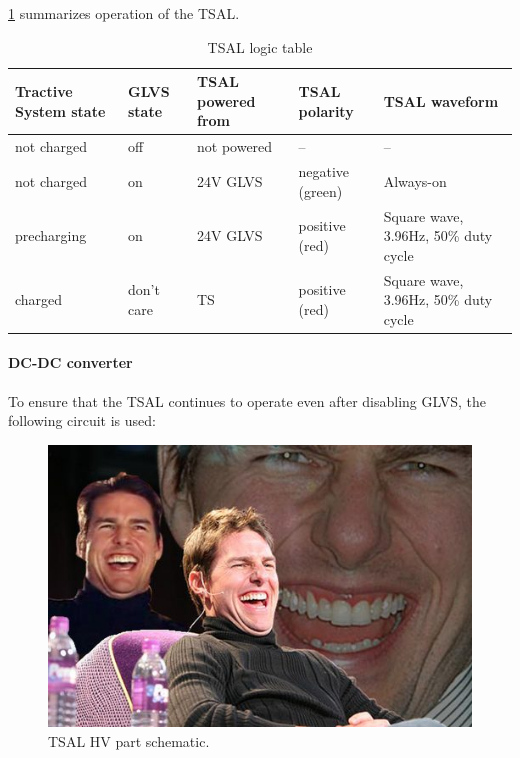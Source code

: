 \ref{fig:TSAL-logic-table} summarizes operation of the TSAL.

\begin{table}[H]
	\centering
	\caption{TSAL logic table}
	\begin{tabularx}{\textwidth}{|X|X|X|X|X|}
		\hline
		\textbf{Tractive System state} & \textbf{GLVS state} & \textbf{TSAL powered from} & \textbf{TSAL polarity} & \textbf{TSAL waveform} \\
		\hline
		not charged & off & not powered & -- & -- \\
		\hline
		not charged & on & 24V GLVS & negative (green) & Always-on \\
		\hline
		precharging & on & 24V GLVS & positive (red) & Square wave, 3.96Hz, 50\% duty cycle \\
		\hline
		charged & don't care & TS & positive (red) & Square wave, 3.96Hz, 50\% duty cycle \\
		\hline
	\end{tabularx}%
	\label{fig:TSAL-logic-table}
\end{table}%

\paragraph{DC-DC converter}

To ensure that the TSAL continues to operate even after disabling GLVS, the following circuit is used:


\begin{figure}[H]
	\centering
	\includegraphics[width=\textwidth]{./img/tsal-hv.jpg}
	\caption{TSAL HV part schematic.}
	\label{fig:TSAL-HV}
\end{figure}

